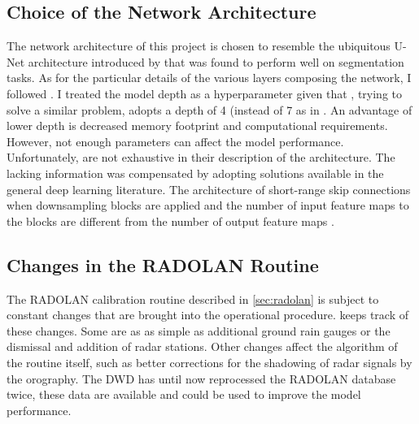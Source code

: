 \subsection{Choice of the Network Architecture}
The network architecture of this project is chosen to resemble the ubiquitous U-Net architecture introduced by \citet{Ronneberger2015U-Net:Segmentation} that was found to perform well on segmentation tasks. As for the particular details of the various layers composing the network, I followed \citet{Agrawal2019MachineImages}. I treated the model depth as a hyperparameter given that \citet{Ayzel2020RainNetNowcasting}, trying to solve a similar problem, adopts a depth of 4 (instead of 7 as in \citet{Agrawal2019MachineImages}. An advantage of lower depth is decreased memory footprint and computational requirements. However, not enough parameters can affect the model performance. Unfortunately, \cite{Agrawal2019MachineImages} are not exhaustive in their description of the architecture. The lacking information was compensated by adopting solutions available in the general deep learning literature. The architecture of short-range skip connections when downsampling blocks are applied and the number of input feature maps to the blocks are different from the number of output feature maps \citep{Drozdzal2016TheSegmentation}. 

\subsection{Changes in the RADOLAN Routine}
The RADOLAN calibration routine described in \cref{sec:radolan} is subject to constant changes that are brought into the operational procedure. \citet{Weigl2021RADOLANRoutine} keeps track of these changes. Some are as as simple as additional ground rain gauges or the dismissal and addition of radar stations. Other changes affect the algorithm of the routine itself, such as better corrections for the shadowing of radar signals by the orography. The DWD has until now reprocessed the RADOLAN database twice, these data are available and could be used to improve the model performance.

